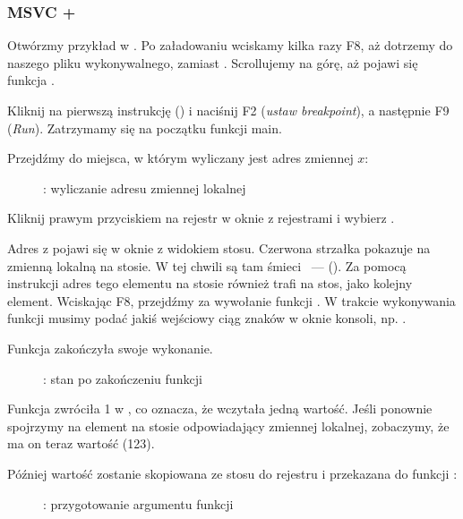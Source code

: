 \clearpage
\subsubsection{MSVC + \olly}
\myindex{\olly}

Otwórzmy przykład w \olly.
Po załadowaniu wciskamy kilka razy F8, aż dotrzemy do naszego pliku wykonywalnego, zamiast .
Scrollujemy na górę, aż pojawi się funkcja \main.

Kliknij na pierwszą instrukcję () i naciśnij F2 (\emph{ustaw breakpoint}), a następnie F9 (\emph{Run}).
Zatrzymamy się na początku funkcji main.

Przejdźmy do miejsca, w którym wyliczany jest adres zmiennej $x$:

\begin{figure}[H]
\centering
{}
\caption{\olly: wyliczanie adresu zmiennej lokalnej}
\label{fig:scanf_ex1_olly_1}
\end{figure}

Kliknij prawym przyciskiem na rejestr \EAX w oknie z rejestrami i wybierz .

Adres z \EAX pojawi się w oknie z widokiem stosu.
Czerwona strzałka pokazuje na zmienną lokalną na stosie.
W tej chwili są tam śmieci ~--- ().
Za pomocą instrukcji \PUSH adres tego elementu na stosie również trafi na stos, jako kolejny element.
Wciskając F8, przejdźmy za wywołanie funkcji \scanf. W trakcie wykonywania funkcji musimy podać jakiś wejściowy ciąg znaków w oknie konsoli, np. .



\clearpage
Funkcja \scanf zakończyła swoje wykonanie.

\begin{figure}[H]
\centering
{}
\caption{\olly: stan po zakończeniu funkcji \scanf}
\label{fig:scanf_ex1_olly_3}
\end{figure}

Funkcja \scanf zwróciła 1 w \EAX, co oznacza, że wczytała jedną wartość.
Jeśli ponownie spojrzymy na element na stosie odpowiadający zmiennej lokalnej, zobaczymy, że ma on teraz wartość  (123).

\clearpage

Później wartość zostanie skopiowana ze stosu do rejestru \ECX i przekazana do funkcji \printf:

\begin{figure}[H]
\centering
{}
\caption{\olly: przygotowanie argumentu funkcji \printf}
\label{fig:scanf_ex1_olly_4}
\end{figure}
